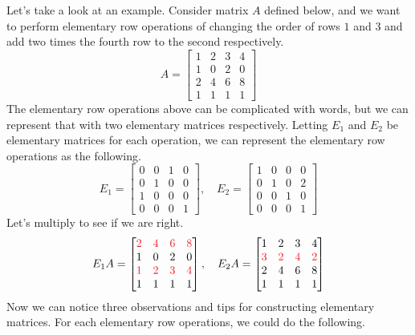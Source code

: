 \documentclass[../main.tex]{subfiles}
\begin{document}
Let's take a look at an example. Consider matrix $A$ defined below,
and we want to perform elementary row operations of changing the
order of rows $1$ and $3$ and add two times the fourth row to the
second respectively.
\[
A =
\begin{bmatrix}
    1 & 2 & 3 & 4 \\
    1 & 0 & 2 & 0 \\
    2 & 4 & 6 & 8 \\
    1 & 1 & 1 & 1
\end{bmatrix}
\]
The elementary row operations above can be complicated with words,
but we can represent that with two elementary matrices respectively.
Letting $E_1$ and $E_2$ be elementary matrices for each operation,
we can represent the elementary row operations as the following.
\[
E_1 =
\begin{bmatrix}
    0 & 0 & 1 & 0 \\
    0 & 1 & 0 & 0 \\
    1 & 0 & 0 & 0 \\
    0 & 0 & 0 & 1
\end{bmatrix},
\quad
E_2 =
\begin{bmatrix}
    1 & 0 & 0 & 0 \\
    0 & 1 & 0 & 2 \\
    0 & 0 & 1 & 0 \\
    0 & 0 & 0 & 1
\end{bmatrix}
\]
Let's multiply to see if we are right.
\[
E_1 A =
\begin{bmatrix}
    \textcolor{Red}{2} &
    \textcolor{Red}{4} &
    \textcolor{Red}{6} &
    \textcolor{Red}{8} \\
    1 & 0 & 2 & 0 \\
    \textcolor{Red}{1} &
    \textcolor{Red}{2} &
    \textcolor{Red}{3} &
    \textcolor{Red}{4} \\
    1 & 1 & 1 & 1
\end{bmatrix},
\quad
E_2 A =
\begin{bmatrix}
    1 & 2 & 3 & 4 \\
    \textcolor{Red}{3} &
    \textcolor{Red}{2} &
    \textcolor{Red}{4} &
    \textcolor{Red}{2} \\
    2 & 4 & 6 & 8 \\
    1 & 1 & 1 & 1
\end{bmatrix}
\]
Now we can notice three observations and tips for constructing
elementary matrices. For each elementary row operations, we could
do the following.
\end{document}
